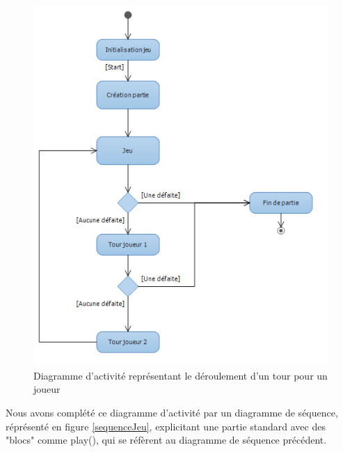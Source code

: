 \begin{figure}[!h] 
\centerline{\includegraphics[width=\textwidth]{img/activite_jeu_ex.png}}
   \caption{\label{étiquette} Diagramme d'activité représentant le déroulement d'un tour pour un joueur}
\label{activiteJeu}
\end{figure}

Nous avons complété ce diagramme d'activité par un diagramme de séquence, réprésenté en figure \ref{sequenceJeu}, explicitant une partie standard avec des "blocs" comme play(), qui se réfèrent au diagramme de séquence précédent.  

